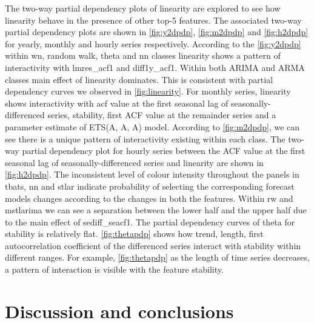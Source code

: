 \documentclass[11pt,a4paper,]{article}
\begin{document}
The two-way partial dependency plots of linearity are explored to see how linearity behave in the presence of other top-5 features. The associated two-way partial dependency plots are shown in \autoref{fig:y2dpdp}, \autoref{fig:m2dpdp} and \autoref{fig:h2dpdp} for yearly, monthly and hourly series respectively. According to the \autoref{fig:y2dpdp} within wn, random walk, theta and nn classes linearity shows a pattern of interactivity with lmres\_acf1 and diff1y\_acf1. Within both ARIMA and ARMA classes main effect of linearity dominates. This is consistent with partial dependency curves we observed in \autoref{fig:linearity}. For monthly series, linearity shows interactivity with acf value at the first seasonal lag of seasonally-differenced series, stability, first ACF value at the remainder series and a parameter estimate of ETS(A, A, A) model. According to \autoref{fig:m2dpdp}, we can see there is a unique pattern of interactivity existing within each class. The two-way partial dependency plot for hourly series between the ACF value at the first seasonal lag of seasonally-differenced series and linearity are shown in \autoref{fig:h2dpdp}. The inconsistent level of colour intensity throughout the panels in tbats, nn and stlar indicate probability of selecting the corresponding forecast models changes according to the changes in both the features. Within rw and mstlarima we can see a separation between the lower half and the upper half due to the main effect of sediff\_seacf1. The partial dependency curves of theta for stability is relatively flat. \autoref{fig:thetapdp} shows how trend, length, first autocorrelation coefficient of the differenced series interact with stability within different ranges. For example, \autoref{fig:thetapdp} as the length of time series decreases, a pattern of interaction is visible with the feature stability.

\hypertarget{discussion}{%
\section{Discussion and conclusions}\label{discussion}}
\end{document}
